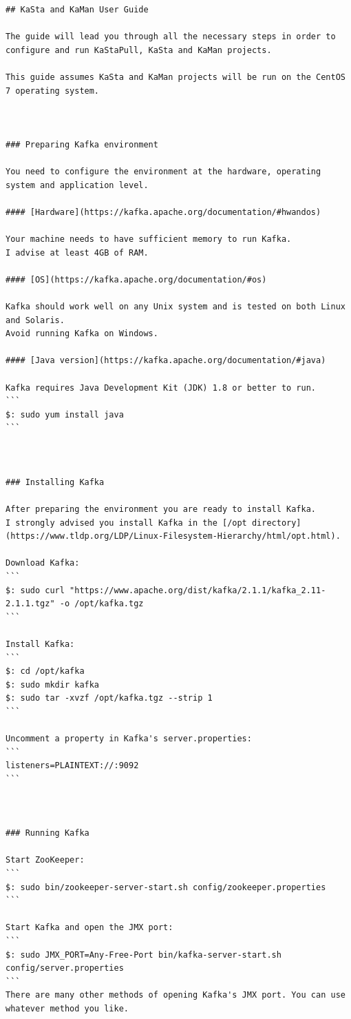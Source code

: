 \documentclass[utf8, diplomski, lmodern, numeric]{fer}
\begin{document}
\begin{lstlisting}[breaklines]
## KaSta and KaMan User Guide

The guide will lead you through all the necessary steps in order to configure and run KaStaPull, KaSta and KaMan projects.  

This guide assumes KaSta and KaMan projects will be run on the CentOS 7 operating system.



### Preparing Kafka environment

You need to configure the environment at the hardware, operating system and application level.  

#### [Hardware](https://kafka.apache.org/documentation/#hwandos)

Your machine needs to have sufficient memory to run Kafka.  
I advise at least 4GB of RAM.  

#### [OS](https://kafka.apache.org/documentation/#os)

Kafka should work well on any Unix system and is tested on both Linux and Solaris.  
Avoid running Kafka on Windows.  

#### [Java version](https://kafka.apache.org/documentation/#java)

Kafka requires Java Development Kit (JDK) 1.8 or better to run.  
```
$: sudo yum install java
```



### Installing Kafka

After preparing the environment you are ready to install Kafka.  
I strongly advised you install Kafka in the [/opt directory](https://www.tldp.org/LDP/Linux-Filesystem-Hierarchy/html/opt.html).  

Download Kafka:  
```
$: sudo curl "https://www.apache.org/dist/kafka/2.1.1/kafka_2.11-2.1.1.tgz" -o /opt/kafka.tgz
```

Install Kafka:  
```
$: cd /opt/kafka
$: sudo mkdir kafka
$: sudo tar -xvzf /opt/kafka.tgz --strip 1
```

Uncomment a property in Kafka's server.properties:  
```
listeners=PLAINTEXT://:9092
```



### Running Kafka

Start ZooKeeper:  
```
$: sudo bin/zookeeper-server-start.sh config/zookeeper.properties
```

Start Kafka and open the JMX port:  
```
$: sudo JMX_PORT=Any-Free-Port bin/kafka-server-start.sh config/server.properties
```
There are many other methods of opening Kafka's JMX port. You can use whatever method you like.  


\end{lstlisting}
\end{document}
